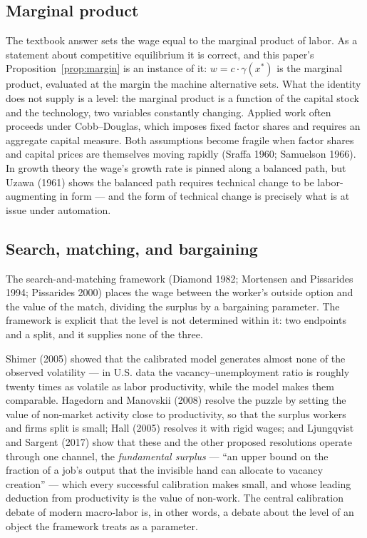 \documentclass[12pt]{article}
\theoremstyle{plain}
\begin{document}
\subsection{Marginal product}\label{sec:marginal-product}

The textbook answer sets the wage equal to the marginal product of labor. As a statement about competitive equilibrium it is correct, and this paper's Proposition~\ref{prop:margin} is an instance of it: $w = c\cdot \gamma (x^*)$  is the marginal product, evaluated at the margin the machine alternative sets. What the identity does not supply is a level: the marginal product is a function of the capital stock and the technology, two variables constantly changing. Applied work often proceeds under Cobb--Douglas, which imposes fixed factor shares and requires an aggregate capital measure. Both assumptions become fragile when factor shares and capital prices are themselves moving rapidly (Sraffa 1960; Samuelson 1966). In growth theory the wage's growth rate is pinned along a balanced path, but Uzawa (1961) shows the balanced path requires technical change to be labor-augmenting in form --- and the form of technical change is precisely what is at issue under automation.

\subsection{Search, matching, and bargaining}\label{sec:search}

The search-and-matching framework (Diamond 1982; Mortensen and Pissarides 1994; Pissarides 2000) places the wage between the worker's outside option and the value of the match, dividing the surplus by a bargaining parameter. The framework is explicit that the level is not determined within it: two endpoints and a split, and it supplies none of the three.

Shimer (2005) showed that the calibrated model generates almost none of the observed volatility --- in U.S. data the vacancy--unemployment ratio is roughly twenty times as volatile as labor productivity, while the model makes them comparable. Hagedorn and Manovskii (2008) resolve the puzzle by setting the value of non-market activity close to productivity, so that the surplus workers and firms split is small; Hall (2005) resolves it with rigid wages; and Ljungqvist and Sargent (2017) show that these and the other proposed resolutions operate through one channel, the \emph{fundamental surplus} --- ``an upper bound on the fraction of a job's output that the invisible hand can allocate to vacancy creation'' --- which every successful calibration makes small, and whose leading deduction from productivity is the value of non-work. The central calibration debate of modern macro-labor is, in other words, a debate about the level of an object the framework treats as a parameter.
\end{document}
